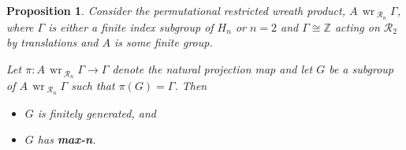 \documentclass[11pt,a4paper]{amsart}
\newtheorem{proposition}[theorem]{Proposition}
\theoremstyle{definition}
\theoremstyle{remark}
\newcommand{\Z}{\mathbb Z}
\newcommand{\Ra}{\mathcal{R}}
\renewcommand{\wr}{\operatorname{\,wr\,}}
\begin{document}
\begin{proposition}
	\label{normal subgroups of wreaths in H_2}
	Consider the permutational restricted wreath product, $A \wr_{\Ra_n} \Gamma$, where $\Gamma$ is either a finite index subgroup of $H_n$ or $n=2$ and $\Gamma \cong \Z$ acting on $\Ra_2$ by translations and $A$ is some finite group.
	
	
	Let $\pi: A \wr_{\Ra_n} \Gamma \to \Gamma$ denote the natural projection map and let $G$ be a subgroup of $A \wr_{\Ra_n} \Gamma$ such that $\pi(G) = \Gamma$. Then 
	\begin{itemize}
		\item $G$ is finitely generated, and
		\item $G$ has \textbf{max-n}. 
	\end{itemize}
\end{proposition}
\end{document}
